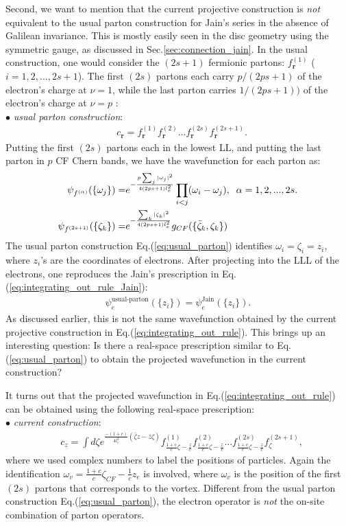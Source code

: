 Second, we want to mention that the current projective construction is \emph{not} equivalent to the usual parton construction for Jain's series in the absence of Galilean invariance. This is mostly easily seen in the disc geometry using the symmetric gauge, as discussed in Sec.\ref{sec:connection_jain}. In the usual construction, one would consider the $(2s+1)$ fermionic partons: $f^{(1)}_{\bm r}$ ($i=1,2,...,2s+1$). The first $(2s)$ partons each carry $p/(2ps+1)$ of the electron's charge at $\nu=1$, while the last parton carries $1/(2ps+1))$ of the electron's charge at $\nu=p$ \cite{jain1989incompressible}:\\
\indent $\bullet$ \emph{usual parton construction}:
\begin{align}
&c_{\bm r}=f^{(1)}_{\bm r}f^{(2)}_{\bm r}... f^{(2s)}_{\bm r} f^{(2s+1)}_{\bm r}.\label{eq:usual_parton}
\end{align}
Putting the first $(2s)$ partons each in the lowest LL, and putting the last parton in $p$ CF Chern bands, we have the wavefunction for each parton as:
\begin{align}
\psi_{f^{(\alpha)}}(\{\omega_j\})=&e^{-\frac{p\sum_j|\omega_j|^2}{4(2ps+1)l_e^2}} \prod_{i<j}(\omega_i-\omega_j), \;\;\alpha=1,2,...,2s.\notag\\
\psi_{f^{(2s+1)}}(\{\zeta_k\})=&e^{-\frac{\sum_k|\zeta_k|^2}{4(2ps+1)l_e^2}} g_{CF}(\{\bar\zeta_k,\zeta_k\})
\end{align}
The usual parton construction Eq.(\ref{eq:usual_parton}) identifies $\omega_i=\zeta_i=z_i$, where $z_i$'s are the coordinates of electrons. After projecting into the LLL of the electrons, one reproduces the Jain's prescription in Eq.(\ref{eq:integrating_out_rule_Jain}):
\begin{align}
\psi^{\text{usual-parton}}_e(\{z_i\})=\psi^{\text{Jain}}_e(\{z_i\}).
\end{align}
As discussed earlier, this is not the same wavefunction obtained by the current projective construction in Eq.(\ref{eq:integrating_out_rule}). This brings up an interesting question: Is there a real-space prescription similar to Eq.(\ref{eq:usual_parton}) to obtain the projected wavefunction in the current construction? 

It turns out that the projected wavefunction in Eq.(\ref{eq:integrating_out_rule}) can be obtained using the following real-space prescription:\\
\indent $\bullet$ \emph{current construction}:
\begin{align}
&c_{z}=\int d\zeta e^{\frac{-(1+c)}{4l_e^2}(\bar\zeta z-\bar z\zeta)} f^{(1)}_{\frac{1+c}{c}\zeta-\frac{z}{c} }f^{(2)}_{\frac{1+c}{c}\zeta-\frac{z}{c}}... f^{(2s)}_{\frac{1+c}{c}\zeta-\frac{z}{c}} f^{(2s+1)}_{\zeta}, \label{eq:current_parton}
\end{align}
where we used complex numbers to label the positions of particles. Again the identification $\omega_v=\frac{1+c}{c}\zeta_{CF}-\frac{1}{c}z_e$ is involved, where $\omega_v$ is the position of the first $(2s)$ partons that corresponds to the vortex. Different from the usual parton construction Eq.(\ref{eq:usual_parton}), the electron operator is \emph{not} the on-site combination of parton operators. 
